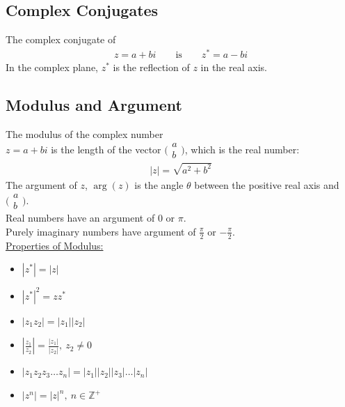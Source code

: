 \documentclass[10pt, a4paper, titlepage]{article}
\begin{document}
\begin{multicols*}{3}
	\subsection{Complex Conjugates}
	The complex conjugate of
	\begin{align}
		z=a+bi\qquad \text{is}\qquad z^*=a-bi
	\end{align}
	In the complex plane, $z^*$ is the reflection of $z$ in the real axis.

	\dotfill
	\subsection{Modulus and Argument}
	The modulus of the complex number \\$z=a+bi$ is the length of the vector $\big(\begin{smallmatrix}a\\ b\end{smallmatrix}\big)$, which is the real number:
	\begin{align}
		|z|=\sqrt{a^2+b^2}
	\end{align}
	The argument of $z$, $\arg({z})$ is the angle $\theta$ between the positive real axis and $\big(\begin{smallmatrix}a\\ b\end{smallmatrix}\big)$.\\
	Real numbers have an argument of 0 or $\pi$.\\
	Purely imaginary numbers have argument of $\frac{\pi}{2}$ or $-\frac{\pi}{2}$.\\

	\underline{Properties of Modulus:}
	\begin{itemize}
		\item $|z^*|=|z|$
		\item $|z^*|^2=zz^*$
		\item $|z_1z_2|=|z_1||z_2|$
		\item $\left|\frac{z_1}{z_2}\right|=\frac{|z_1|}{|z_2|},\ z_2\neq 0$
		\item $|z_1z_2z_3\dots z_n|=|z_1||z_2||z_3|\dots |z_n|$
		\item $|z^n|=|z|^n,\ n\in \mathbb{Z}^+$
	\end{itemize}

	\dotfill

\end{multicols*}
\end{document}
